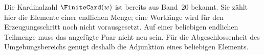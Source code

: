 
Die Kardinalzahl \(\FiniteCard(w)\) ist bereits aus Band~20 bekannt. Sie zählt
hier die Elemente einer endlichen Menge; eine Wortlänge wird für den
Erzeugungsschritt noch nicht vorausgesetzt. Auf einer beliebigen endlichen
Teilmenge muss das angefügte Paar nicht neu sein. Für die Abgeschlossenheit
des Umgebungsbereichs genügt deshalb die Adjunktion eines beliebigen
Elements.

\begin{tabproofwide}
\end{tabproofwide}

